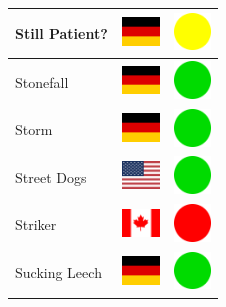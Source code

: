 \documentclass[12pt, a4paper, twoside]{report}
\begin{document}
\begin{center}
\begin{longtable}{|p{5cm}|p{2cm}|p{2cm}|}
			Still Patient? & \includegraphics[width=1cm]{4x3/de} & \includegraphics[width=1cm]{likes/m} \\ \hline
			Stonefall & \includegraphics[width=1cm]{4x3/de} & \includegraphics[width=1cm]{likes/y} \\ \hline
			Storm & \includegraphics[width=1cm]{4x3/de} & \includegraphics[width=1cm]{likes/y} \\ \hline
			Street Dogs & \includegraphics[width=1cm]{4x3/us} & \includegraphics[width=1cm]{likes/y} \\ \hline
			Striker & \includegraphics[width=1cm]{4x3/ca} & \includegraphics[width=1cm]{likes/n} \\ \hline
			Sucking Leech & \includegraphics[width=1cm]{4x3/de} & \includegraphics[width=1cm]{likes/y} \\ \hline

\end{longtable}
\end{center}
\end{document}
